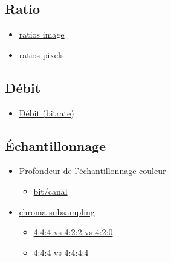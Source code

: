 \documentclass[
]{book}
\providecommand{\tightlist}{%
  \setlength{\itemsep}{0pt}\setlength{\parskip}{0pt}}
\begin{document}
\hypertarget{ratio}{%
\subsection{Ratio}\label{ratio}}

\begin{itemize}
\tightlist
\item
  \href{https://en.wikipedia.org/wiki/Display_aspect_ratio}{ratios image}
\item
  \href{https://en.wikipedia.org/wiki/Pixel_aspect_ratio}{ratios-pixels}
\end{itemize}

\hypertarget{duxe9bit}{%
\subsection{Débit}\label{duxe9bit}}

\begin{itemize}
\tightlist
\item
  \href{https://en.wikipedia.org/wiki/Bit_rate\#Video}{Débit (bitrate)}
\end{itemize}

\hypertarget{uxe9chantillonnage}{%
\subsection{Échantillonnage}\label{uxe9chantillonnage}}

\begin{itemize}
\tightlist
\item
  Profondeur de l'échantillonnage couleur

  \begin{itemize}
  \tightlist
  \item
    \href{https://en.wikipedia.org/wiki/Color_depth}{bit/canal}\\
  \end{itemize}
\item
  \href{https://en.wikipedia.org/wiki/Chroma_subsampling\#Sampling_systems_and_ratios}{chroma subsampling}

  \begin{itemize}
  \tightlist
  \item
    \href{https://upload.wikimedia.org/wikipedia/commons/0/06/Colorcomp.jpg}{4:4:4 vs 4:2:2 vs 4:2:0}
  \item
    \href{https://en.wikipedia.org/wiki/Alpha_compositing}{4:4:4 vs 4:4:4:4}
  \end{itemize}
\end{itemize}
\end{document}
